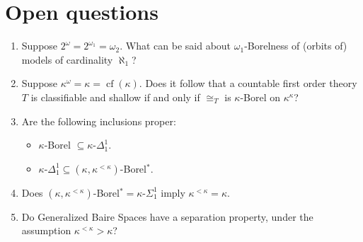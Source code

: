 \documentclass[12pt,a4paper]{amsart}
\theoremstyle{definition}
\theoremstyle{remark}
\DeclareMathOperator{\cf}{cf}
\def\borelstar{Borel\nobreak\hspace{1pt}$^*$}
\begin{document}
\section{Open questions}
\begin{enumerate}
    \item Suppose $2^\omega=2^{\omega_1}=\omega_2$. What can be said about $\omega_1$-Borelness of (orbits of) models of cardinality $\aleph_1$? 
    \item  Suppose $\kappa^\omega=\kappa=\cf(\kappa)$. Does it follow that a countable first order theory $T$
is classifiable and shallow if and only if $\cong_T$ is $\kappa$-Borel on $\kappa^\kappa$?
    \item Are the following inclusions proper:
    \begin{itemize}
        \item $\kappa$-Borel $\subseteq \kappa$-$\Delta_1^1$.
        \item $\kappa$-$\Delta_1^1\subseteq (\kappa,\kappa^{<\kappa})$-\borelstar.
    \end{itemize}
    \item Does $(\kappa,\kappa^{<\kappa})$-\borelstar$=\kappa$-$\Sigma_1^1$ imply $\kappa^{<\kappa}=\kappa$.
    \item Do Generalized Baire Spaces have a separation property, under the assumption $\kappa^{<\kappa}>\kappa$? 
\end{enumerate}
\end{document}
